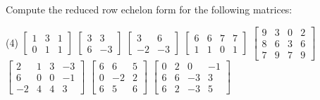 \begin{samepage}
\begin{exercise}
Compute the reduced row echelon form for the following matrices:
\begin{tasks}(4)
\task
$\begin{bmatrix}
1 & 3 & 1 \\
0 & 1 & 1
\end{bmatrix}$
\task
$\begin{bmatrix}
3 & 3 \\
6 & -3
\end{bmatrix}$
\task
$\begin{bmatrix}
3 & 6 \\
-2 & -3
\end{bmatrix}$
\task
$\begin{bmatrix}
6 & 6 & 7 & 7 \\
1 & 1 & 0 & 1
\end{bmatrix}$
\task
$\begin{bmatrix}
9 & 3 & 0 & 2 \\
8 & 6 & 3 & 6 \\
7 & 9 & 7 & 9
\end{bmatrix}$
\task
$\begin{bmatrix}
2 & 1 & 3 & -3 \\
6 & 0 & 0 & -1 \\
-2 & 4 & 4 & 3
\end{bmatrix}$
\task
$\begin{bmatrix}
6 & 6 & 5 \\
0 & -2 & 2 \\
6 & 5 & 6
\end{bmatrix}$
\task
$\begin{bmatrix}
0 & 2 & 0 & -1 \\
6 & 6 & -3 & 3 \\
6 & 2 & -3 & 5
\end{bmatrix}$
\end{tasks}
\end{exercise}
\end{samepage}
\comboSol{%
}
